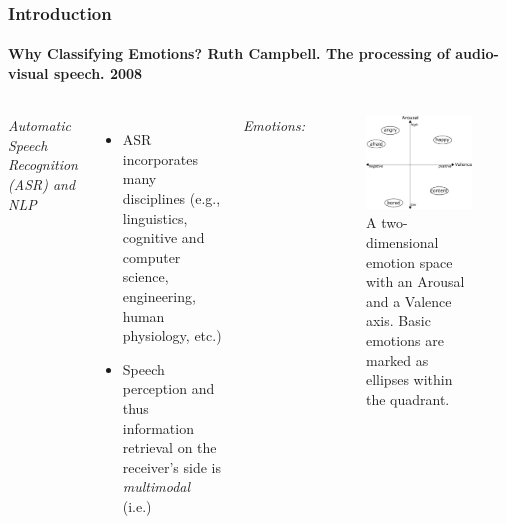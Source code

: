 \documentclass[10pt,usepdftitle=false,aspectratio=169]{beamer}
\begin{document}
\setlength{\figwidth}{.9\textwidth}
\setlength{\figheight}{.6\textheight}



\begin{frame}\frametitle{Introduction}
    \framesubtitle{Why Classifying  Emotions?  \hspace*{20em} Ruth Campbell. The processing of audio-visual speech. 2008}
    
\begin{columns}
	
    \emph{Automatic Speech Recognition (ASR) and NLP}

	\begin{itemize}
		\item ASR incorporates many disciplines (e.g., linguistics, cognitive and computer science, engineering, human physiology, etc.)
		\item Speech perception and thus information retrieval on the receiver's side is \emph{multimodal} (i.e.)
	\end{itemize}
\vspace{2em}


\vspace{1em}
\emph{Emotions:}

\begin{figure}
	\includegraphics[width=.7\textwidth]{figures/2DemotionMapping.pdf}	
	\caption{A two-dimensional emotion space with an Arousal and a Valence axis. Basic emotions are marked as ellipses within the quadrant. }

\end{figure}


	
	\end{columns}
\end{frame}
\end{document}
